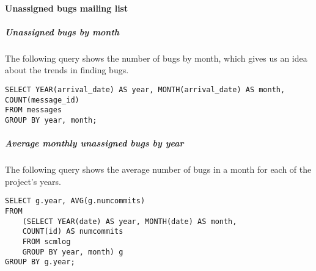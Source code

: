 \paragraph{Unassigned bugs mailing list}

\subparagraph{Unassigned bugs by month}

The following query shows the number of bugs by month, which gives us an idea about the trends in finding bugs.

\begin{verbatim}
SELECT YEAR(arrival_date) AS year, MONTH(arrival_date) AS month, 
COUNT(message_id) 
FROM messages 
GROUP BY year, month;
\end{verbatim}

\subparagraph{Average monthly unassigned bugs by year}

The following query shows the average number of bugs in a month for each of the project's years.

\begin{verbatim}
SELECT g.year, AVG(g.numcommits) 
FROM 
	(SELECT YEAR(date) AS year, MONTH(date) AS month, 
	COUNT(id) AS numcommits 
	FROM scmlog 
	GROUP BY year, month) g
GROUP BY g.year;
\end{verbatim}

